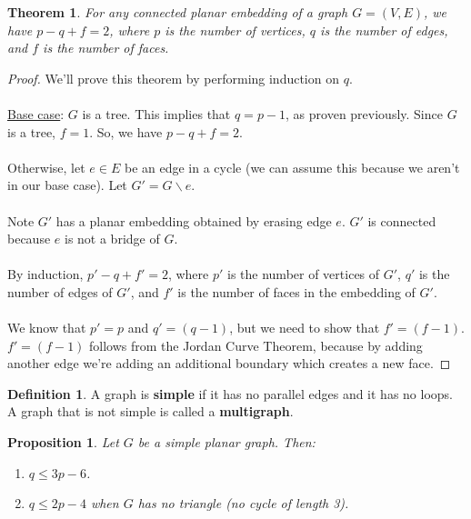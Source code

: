 \documentclass[]{article}
\newtheorem*{theorem}{Theorem}
\newtheorem*{proposition}{Proposition}
\theoremstyle{definition}
\newtheorem*{defn}{Definition}
\newcommand{\lecture}[1]{\marginpar{{\footnotesize $\leftarrow$ \underline{#1}}}}
\begin{document}
			\begin{theorem}
				For any connected planar embedding of a graph $G = (V, E)$, we have $p - q + f = 2$, where $p$ is the number of vertices, $q$ is the number of edges, and $f$ is the number of faces.
			\end{theorem}

			\begin{proof}
				We'll prove this theorem by performing induction on $q$.
				\\ \\
				\underline{Base case}: $G$ is a tree. This implies that $q = p - 1$, as proven previously. Since $G$ is a tree, $f = 1$. So, we have $p - q + f = 2$.
				\\ \\
				Otherwise, let $e \in E$ be an edge in a cycle (we can assume this because we aren't in our base case). Let $G' = G \backslash e$.
				\\ \\
				Note $G'$ has a planar embedding obtained by erasing edge $e$. $G'$ is connected because $e$ is not a bridge of $G$.
				\\ \\
				By induction, $p' - q + f' = 2$, where $p'$ is the number of vertices of $G'$, $q'$ is the number of edges of $G'$, and $f'$ is the number of faces in the embedding of $G'$.
				\\ \\
				We know that $p' = p$ and $q' = (q - 1)$, but we need to show that $f' = (f - 1)$. $f' = (f - 1)$ follows from the Jordan Curve Theorem, because by adding another edge we're adding an additional boundary which creates a new face.
			\end{proof}
			
			\begin{defn} \lecture{March 15, 2013}
				A graph is \textbf{simple} if it has no parallel edges and it has no loops. A graph that is not simple is called a \textbf{multigraph}.
			\end{defn}

			\begin{proposition}
				Let $G$ be a simple planar graph. Then:
				\begin{enumerate}
					\item $q \le 3p - 6$.
					\item $q \le 2p - 4$ when $G$ has no triangle (no cycle of length 3).
				\end{enumerate}
			\end{proposition}
\end{document}
